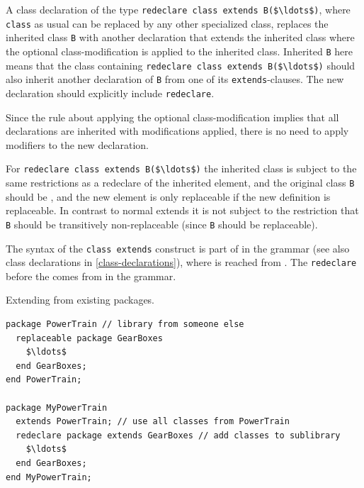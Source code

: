A class declaration of the type \lstinline!redeclare class extends B($\ldots$)!, where \lstinline!class! as usual can be replaced by any other specialized class, replaces the inherited class \lstinline!B! with another declaration that extends the inherited class where the optional class-modification is applied to the inherited class.
Inherited \lstinline!B! here means that the class containing \lstinline!redeclare class extends B($\ldots$)! should also inherit another declaration of \lstinline!B! from one of its \lstinline!extends!-clauses.
The new declaration should explicitly include \lstinline!redeclare!.

\begin{nonnormative}
Since the rule about applying the optional class-modification implies that all declarations are inherited with modifications applied, there is no need to apply modifiers to the new declaration.
\end{nonnormative}

For \lstinline!redeclare class extends B($\ldots$)! the inherited class is subject to the same restrictions as a redeclare of the inherited element, and the original class \lstinline!B! should be , and the new element is only replaceable if the new definition is replaceable.
In contrast to normal extends it is not subject to the restriction that \lstinline!B! should be transitively non-replaceable (since \lstinline!B! should be replaceable).

The syntax of the \lstinline!class extends! construct is part of  in the grammar (see also class declarations in \cref{class-declarations}), where  is reached from .
The \lstinline!redeclare! before the  comes from  in the grammar.

\begin{example}
Extending from existing packages.
\begin{lstlisting}[language=modelica]
package PowerTrain // library from someone else
  replaceable package GearBoxes
    $\ldots$
  end GearBoxes;
end PowerTrain;

package MyPowerTrain
  extends PowerTrain; // use all classes from PowerTrain
  redeclare package extends GearBoxes // add classes to sublibrary
    $\ldots$
  end GearBoxes;
end MyPowerTrain;
\end{lstlisting}
\end{example}

